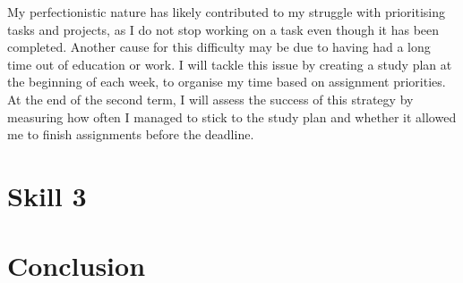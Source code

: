 \documentclass{scrartcl}
\begin{document}
My perfectionistic nature has likely contributed to my struggle with prioritising tasks and projects, as I do not stop working on a task even though it has been completed. Another cause for this difficulty may be due to having had a long time out of education or work. I will tackle this issue by creating a study plan at the beginning of each week, to organise my time based on assignment priorities. At the end of the second term, I will assess the success of this strategy by measuring how often I managed to stick to the study plan and whether it allowed me to finish assignments before the deadline.


  

\section{Skill 3}

\section{Conclusion}



\end{document}
